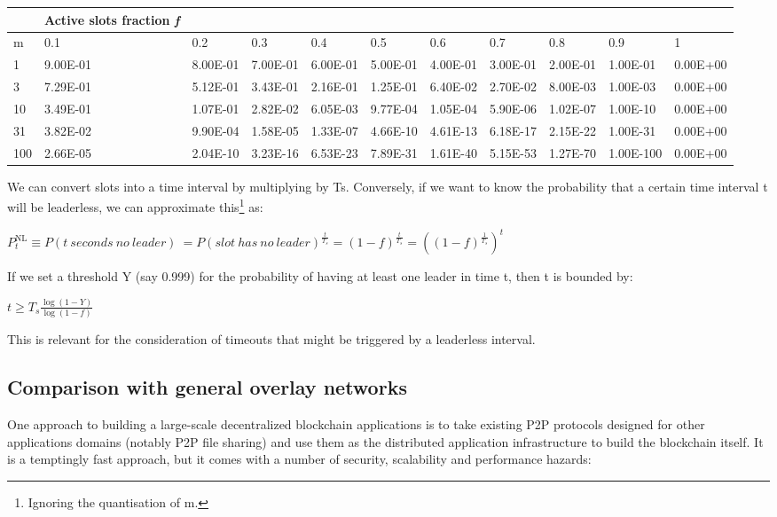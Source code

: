 \documentclass[11pt,a4paper]{article}
\begin{document}
\begin{longtable}[]{@{}lllllllllll@{}}
\toprule
& \textbf{Active slots fraction \emph{f}} & & & & & & & &
&\tabularnewline
\midrule
\endhead
m & 0.1 & 0.2 & 0.3 & 0.4 & 0.5 & 0.6 & 0.7 & 0.8 & 0.9 &
1\tabularnewline
1 & 9.00E-01 & 8.00E-01 & 7.00E-01 & 6.00E-01 & 5.00E-01 & 4.00E-01 &
3.00E-01 & 2.00E-01 & 1.00E-01 & 0.00E+00\tabularnewline
3 & 7.29E-01 & 5.12E-01 & 3.43E-01 & 2.16E-01 & 1.25E-01 & 6.40E-02 &
2.70E-02 & 8.00E-03 & 1.00E-03 & 0.00E+00\tabularnewline
10 & 3.49E-01 & 1.07E-01 & 2.82E-02 & 6.05E-03 & 9.77E-04 & 1.05E-04 &
5.90E-06 & 1.02E-07 & 1.00E-10 & 0.00E+00\tabularnewline
31 & 3.82E-02 & 9.90E-04 & 1.58E-05 & 1.33E-07 & 4.66E-10 & 4.61E-13 &
6.18E-17 & 2.15E-22 & 1.00E-31 & 0.00E+00\tabularnewline
100 & 2.66E-05 & 2.04E-10 & 3.23E-16 & 6.53E-23 & 7.89E-31 & 1.61E-40 &
5.15E-53 & 1.27E-70 & 1.00E-100 & 0.00E+00\tabularnewline
\bottomrule
\end{longtable}

We can convert slots into a time interval by multiplying by Ts.
Conversely, if we want to know the probability that a certain time
interval t will be leaderless, we can approximate this\footnote{Ignoring
  the quantisation of m.} as:

\(P_{t}^{\text{NL}} \equiv P(t\ seconds\ no\ leader)\  = {P(slot\ has\ no\ leader)}^{\frac{t}{T_{s}}} = \left( 1 - f \right)^{\frac{t}{T_{s}}} = \left( \left( 1 - f \right)^{\frac{1}{T_{s}}} \right)^{t}\)

If we set a threshold Y (say 0.999) for the probability of having at
least one leader in time t, then t is bounded by:

\(t \geq T_{s}\frac{\log\left( 1 - Y \right)}{\log\left( 1 - f \right)}\)

This is relevant for the consideration of timeouts that might be
triggered by a leaderless interval.

\subsection{Comparison with general overlay networks}
\label{comparison-with-general-overlay-networks}

One approach to building a large-scale decentralized blockchain
applications is to take existing P2P protocols designed for other
applications domains (notably P2P file sharing) and use them as the
distributed application infrastructure to build the blockchain itself.
It is a temptingly fast approach, but it comes with a number of
security, scalability and performance hazards:
\end{document}
